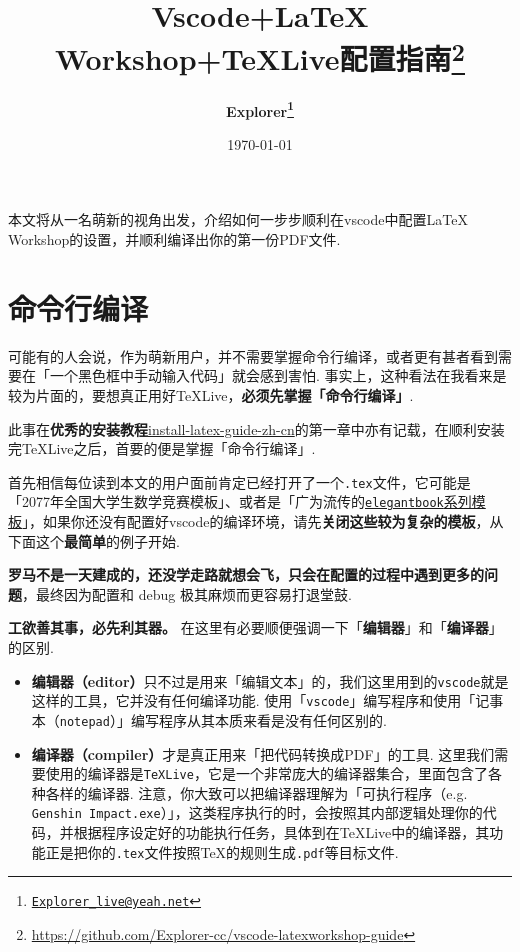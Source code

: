 \documentclass[11pt,fontset=ubuntu,notitlepage]{ctexrep}
\begin{document}
\makeatletter
\renewcommand*{\@fnsymbol}[1]{\ensuremath{\number#1}}
\makeatother
\title{\huge\bfseries Vscode+LaTeX Workshop+TeXLive配置指南\thanks{\url{https://github.com/Explorer-cc/vscode-latexworkshop-guide}}}
\author{\Large\bfseries Explorer\thanks{\href{mailto:Explorer_live@yeah.net}{\texttt{Explorer\_live@yeah.net}}}}
\date{\Large \today}

\maketitle

本文将从一名萌新的视角出发，介绍如何一步步顺利在vscode中配置LaTeX Workshop的设置，并顺利编译出你的第一份PDF文件.

\chapter{命令行编译}

可能有的人会说，作为萌新用户，并不需要掌握命令行编译，或者更有甚者看到需要在「一个黑色框中手动输入代码」就会感到害怕. 事实上，这种看法在我看来是较为片面的，要想真正用好TeXLive，\textbf{必须先掌握「命令行编译」}.

此事在\textbf{优秀的安装教程}\href{https://github.com/OsbertWang/install-latex-guide-zh-cn}{install-latex-guide-zh-cn}的第一章中亦有记载，在顺利安装完TeXLive之后，首要的便是掌握「命令行编译」.

首先相信每位读到本文的用户面前肯定已经打开了一个\texttt{.tex}文件，它可能是「2077年全国大学生数学竞赛模板」、或者是「广为流传的\href{https://github.com/ElegantLaTeX/ElegantBook}{\texttt{elegantbook}系列模板}」，如果你还没有配置好vscode的编译环境，请先\textbf{关闭这些较为复杂的模板}，从下面这个\textbf{最简单}的例子开始.

\textbf{罗马不是一天建成的，还没学走路就想会飞，只会在配置的过程中遇到更多的问题}，最终因为配置和 debug 极其麻烦而更容易打退堂鼓.

\textbf{工欲善其事，必先利其器。} 在这里有必要顺便强调一下「\textbf{编辑器}」和「\textbf{编译器}」的区别.

\begin{itemize}
  \item \textbf{编辑器（editor）}只不过是用来「编辑文本」的，我们这里用到的\texttt{vscode}就是这样的工具，它并没有任何编译功能. 使用「\texttt{vscode}」编写程序和使用「记事本（\texttt{notepad}）」编写程序从其本质来看是没有任何区别的.
  \item \textbf{编译器（compiler）}才是真正用来「把代码转换成PDF」的工具. 这里我们需要使用的编译器是\texttt{TeXLive}，它是一个非常庞大的编译器集合，里面包含了各种各样的编译器. 注意，你大致可以把编译器理解为「可执行程序（e.g. \texttt{Genshin Impact.exe}）」，这类程序执行的时，会按照其内部逻辑处理你的代码，并根据程序设定好的功能执行任务，具体到在TeXLive中的编译器，其功能正是把你的\texttt{.tex}文件按照\TeX{}的规则生成\texttt{.pdf}等目标文件.
\end{itemize}
\end{document}
